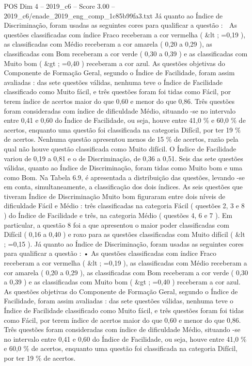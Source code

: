 \begin{textsample}{POS Dim 4 – 2019\_c6 – Score 3.00 – 2019\_c6/enade\_2019\_eng\_comp\_1c85b99fa3.txt}
Já quanto ao Índice de Discriminação, foram usadas as seguintes cores para qualificar a questão :  As questões classificadas com índice Fraco receberam a cor vermelha ( \&lt ; =0,19 ), as classificadas com Médio receberam a cor amarela ( 0,20 a 0,29 ), as classificadas com Bom receberam a cor verde ( 0,30 a 0,39 ) e as classificadas com Muito bom ( \&gt ; =0,40 ) receberam a cor azul.
As questões objetivas do Componente de Formação Geral, segundo o Índice de Facilidade, foram assim avaliadas : das sete questões válidas, nenhuma teve o Índice de Facilidade classificado como Muito fácil, e três questões foram foi tidas como Fácil, por terem índice de acertos maior do que 0,60 e menor do que 0,86.
Três questões foram consideradas com índice de dificuldade Médio, situando -se no intervalo entre 0,41 e 0,60 do Índice de Facilidade, ou seja, houve entre 41,0 \% e 60,0 \% de acertos, enquanto uma questão foi classificada na categoria Difícil, por ter 19 \% de acertos.
Nenhuma questão apresentou menos de 15 \% de acertos, razão pela qual não houve questão classificada como Muito difícil.
O Índice de Facilidade variou de 0,19 a 0,81 e o de Discriminação, de 0,36 a 0,51.
Seis das sete questões válidas, quanto ao Índice de Discriminação, foram tidas como Muito bom e uma como Bom.
Na Tabela 6.9, é apresentada a distribuição das questões, levando -se em conta, simultaneamente, a classificação dos dois índices.
As seis questões que tiveram Índice de Discriminação Muito bom figuraram entre dois níveis de dificuldade Fácil e Médio : três classificadas na categoria Fácil ( questões 2, 3 e 8 ) do Índice de Facilidade e três, na categoria Médio ( questões 4, 6 e 7 ).
Em particular, a questão 8 foi a que apresentou o maior poder classificadas com Difícil ( 0,16 a 0,40 ) e roxo para as questões classificadas com Muito difícil ( \&lt ; =0,15 ).
Já quanto ao Índice de Discriminação, foram usadas as seguintes cores para qualificar a questão : • As questões classificadas com índice Fraco receberam a cor vermelha ( \&lt ; =0,19 ), as classificadas com Médio receberam a cor amarela ( 0,20 a 0,29 ), as classificadas com Bom receberam a cor verde ( 0,30 a 0,39 ) e as classificadas com Muito bom ( \&gt ; =0,40 ) receberam a cor azul.
As questões objetivas do Componente de Formação Geral, segundo o Índice de Facilidade, foram assim avaliadas : das sete questões válidas, nenhuma teve o Índice de Facilidade classificado como Muito fácil, e três questões foram foi tidas como Fácil, por terem índice de acertos maior do que 0,60 e menor do que 0,86.
Três questões foram consideradas com índice de dificuldade Médio, situando -se no intervalo entre 0,41 e 0,60 do Índice de Facilidade, ou seja, houve entre 41,0 \% e 60,0 \% de acertos, enquanto uma questão foi classificada na categoria Difícil, por ter 19 \% de acertos.

\end{textsample}

